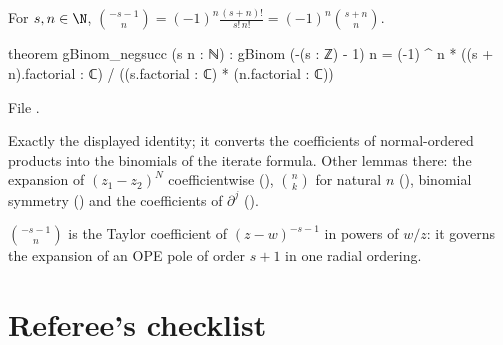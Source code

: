 \begin{lemma}\label{l03:lem:negbinom}
For $s,n\in\N$, $\binom{-s-1}{n} = (-1)^n\frac{(s+n)!}{s!\,n!} = (-1)^n\binom{s+n}{n}$.
\end{lemma}
\begin{leancode}
theorem gBinom_negsucc (s n : ℕ) :
    gBinom (-(s : ℤ) - 1) n =
      (-1) ^ n * ((s + n).factorial : ℂ) /
        ((s.factorial : ℂ) * (n.factorial : ℂ))
\end{leancode}
File .

\begin{dictionary}
Exactly the displayed identity; it converts the coefficients of normal-ordered products into the
binomials of the iterate formula. Other lemmas there: the expansion of $(z_1-z_2)^N$ coefficientwise
(), $\binom nk$ for natural $n$ (), binomial
symmetry () and the coefficients of $\partial^j$ ().
\end{dictionary}

\begin{physics}
$\binom{-s-1}{n}$ is the Taylor coefficient of $(z-w)^{-s-1}$ in powers of $w/z$: it governs the
expansion of an OPE pole of order $s+1$ in one radial ordering.
\end{physics}

\section{Referee's checklist}\label{l03:sec:checklist}

